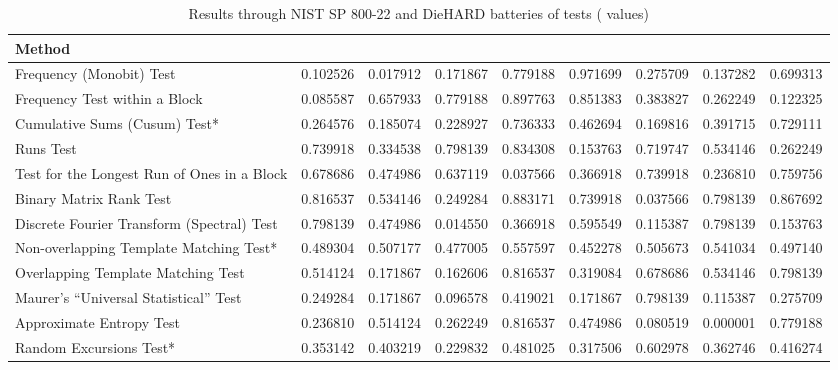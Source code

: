 \documentclass[conference]{IEEEtran}
\begin{document}
\begin{table*}[t]
\renewcommand{\arraystretch}{1.3}
\caption{Results through NIST SP 800-22 and DieHARD batteries of tests ( values)}
\label{The passing rate}
\centering
  \begin{tabular}{|l||c|c|c|c|c|c|c|c|}
    \hline
Method &  &   &  &  &  &  &  & \\ \hline\hline


Frequency (Monobit) Test            &  0.102526 &  0.017912 &  0.171867 &  0.779188 &  0.971699 &  0.275709 &  0.137282 &    0.699313 \\ \hline
Frequency Test within a Block             &  0.085587 &  0.657933 &  0.779188 &  0.897763 &  0.851383 &  0.383827 &  0.262249 &    0.122325 \\ \hline
Cumulative Sums (Cusum) Test*             &  0.264576 &  0.185074 &  0.228927 &  0.736333 &  0.462694 &  0.169816 &  0.391715 &    0.729111\\ \hline
Runs Test                    &  0.739918 &  0.334538 &  0.798139 &  0.834308 &  0.153763 &  0.719747 &  0.534146 &    0.262249 \\ \hline
Test for the Longest Run of Ones in a Block     &  0.678686 &  0.474986 &  0.637119 &  0.037566 &  0.366918 &  0.739918 &  0.236810 &    0.759756 \\ \hline
Binary Matrix Rank Test                & 0.816537 &  0.534146 &  0.249284 &  0.883171 &  0.739918 &  0.037566 &  0.798139 &    0.867692 \\ \hline
Discrete Fourier Transform (Spectral) Test     &   0.798139 &  0.474986 &  0.014550 &  0.366918 &  0.595549 &  0.115387 &  0.798139 &    0.153763 \\ \hline
Non-overlapping Template Matching Test*        &  0.489304 &  0.507177 &  0.477005 &  0.557597 &  0.452278 &  0.505673 &  0.541034 &    0.497140 \\ \hline
Overlapping Template Matching Test        &  0.514124 &  0.171867 &  0.162606 &  0.816537 &  0.319084 &  0.678686 &  0.534146 &    0.798139 \\ \hline
Maurer’s “Universal Statistical” Test         &   0.249284 &  0.171867 &  0.096578 &  0.419021 &  0.171867 &  0.798139 &  0.115387 &    0.275709 \\ \hline
Approximate Entropy Test             & 0.236810 &  0.514124 &  0.262249 &  0.816537 &  0.474986 &  0.080519 &  0.000001 &    0.779188\\ \hline
Random Excursions Test*                &  0.353142 &  0.403219 &  0.229832 &  0.481025 &  0.317506 &  0.602978 &  0.362746 &    0.416274 \\ \hline

\end{tabular}
\end{table*}
\end{document}
